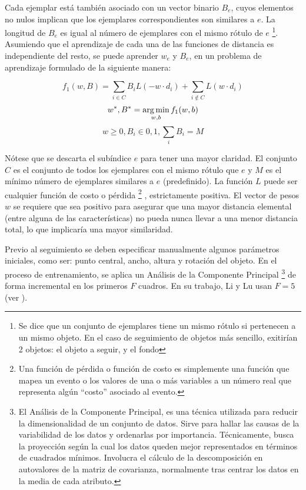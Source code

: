 Cada ejemplar está también asociado con un vector binario $B_{e}$, cuyos elementos
no nulos implican que los ejemplares correspondientes son similares a $e$. La
longitud de $B_{e}$ es igual al número de ejemplares con el mismo rótulo de $e$
\footnote{Se dice que un conjunto de ejemplares tiene un mismo rótulo si pertenecen a un mismo objeto. En el caso de seguimiento de objetos
más sencillo, exitirían 2 objetos: el objeto a seguir, y el fondo}.
Asumiendo que el aprendizaje de cada una de las funciones de distancia es
independiente del resto, se puede aprender $w_{e}$ y $B_{e}$, en un problema
de aprendizaje formulado de la siguiente manera:

\begin{equation}
    \label{eq:learning-problem}
    f_{1}(w,B) = \sum_{i \in C} B_{i}L(-w \cdot d_{i}) + \sum_{i\notin C}L(w \cdot d_{i})
\end{equation}
\begin{equation}
    {w^{*}, B^{*} = \operatorname*{arg\,min}_{w,b} f_{1} (w,b) }
\end{equation}
\begin{equation}
   w \geq 0, B_{i} \in {0,1}, \sum_{i} B_{i} = M
\end{equation}

Nótese que se descarta el subíndice $e$ para tener una mayor claridad. El
conjunto $C$ es el conjunto de todos los ejemplares con el mismo rótulo que $e$
y $M$ es el mínimo número de ejemplares similares a $e$ (predefinido). La
función $L$ puede ser cualquier función de costo o pérdida \footnote{Una
función de pérdida o función de costo es simplemente una función que mapea un
evento o los valores de una o más variables a un número real que representa
algún ``costo'' asociado al evento.} , estrictamente positiva. El vector de
pesos $w$ se requiere que sea positivo para asegurar que una mayor distancia
elemental (entre alguna de las características) no pueda nunca llevar a una
menor distancia total, lo que implicaría una mayor similaridad.

Previo al seguimiento se deben especificar manualmente algunos parámetros iniciales,
como ser: punto central, ancho, altura y rotación del objeto. En el proceso de
entrenamiento, se aplica un Análisis de la Componente Principal
\footnote{El Análisis de la Componente Principal, es una técnica utilizada para reducir la dimensionalidad de un conjunto de datos.
Sirve para hallar las causas de la variabilidad de los datos y ordenarlas por importancia.
Técnicamente, busca la proyección según la cual los datos queden mejor representados en términos de cuadrados mínimos. Involucra el cálculo de la descomposición en
autovalores de la matriz de covarianza, normalmente tras centrar los datos en la media de cada atributo.}
de forma incremental en los primeros $F$ cuadros. En su trabajo, Li y Lu usan
$F = 5$ (ver \cite{local-learning}).

